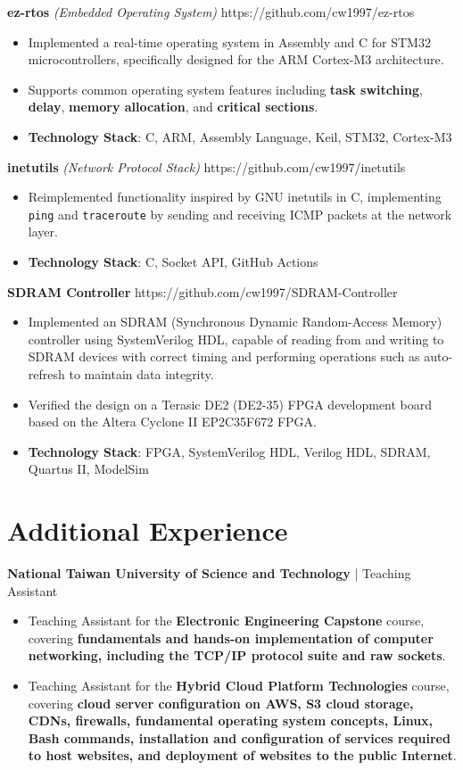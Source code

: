 \documentclass{resume}
\newcommand{\iconsection}[2]{
  \section[\texorpdfstring{#2}{#2}]{\faIcon{#1}\quad #2}
}
\begin{document}
  \datedsubsection
  {\textbf{ez-rtos}\textit{ (Embedded Operating System)}}
  {https://github.com/cw1997/ez-rtos}
  \begin{itemize}
    \item Implemented a real-time operating system in Assembly and C for STM32 microcontrollers, specifically designed for the ARM Cortex-M3 architecture.
    \item Supports common operating system features including \textbf{task switching}, \textbf{delay}, \textbf{memory allocation}, and \textbf{critical sections}.
    \item \textbf{Technology Stack}: C, ARM, Assembly Language, Keil, STM32, Cortex-M3
  \end{itemize}

  \datedsubsection
  {\textbf{inetutils}\textit{ (Network Protocol Stack)}}
  {https://github.com/cw1997/inetutils}
  \begin{itemize}
    \item Reimplemented functionality inspired by GNU inetutils in C, implementing \texttt{ping} and \texttt{traceroute} by sending and receiving ICMP packets at the network layer.
    \item \textbf{Technology Stack}: C, Socket API, GitHub Actions
  \end{itemize}

  \datedsubsection
  {\textbf{SDRAM Controller}}
  {https://github.com/cw1997/SDRAM-Controller}
  \begin{itemize}
    \item Implemented an SDRAM (Synchronous Dynamic Random-Access Memory) controller using SystemVerilog HDL, capable of reading from and writing to SDRAM devices with correct timing and performing operations such as auto-refresh to maintain data integrity.
    \item Verified the design on a Terasic DE2 (DE2-35) FPGA development board based on the Altera Cyclone II EP2C35F672 FPGA.
    \item \textbf{Technology Stack}: FPGA, SystemVerilog HDL, Verilog HDL, SDRAM, Quartus II, ModelSim
  \end{itemize}

  \iconsection{history}{Additional Experience}

  \datedsubsection
  {\textbf{National Taiwan University of Science and Technology} | Teaching Assistant}
  {}
  \begin{itemize}
    \item Teaching Assistant for the \textbf{Electronic Engineering Capstone} course, covering \textbf{fundamentals and hands-on implementation of computer networking, including the TCP/IP protocol suite and raw sockets}.
    \item Teaching Assistant for the \textbf{Hybrid Cloud Platform Technologies} course, covering \textbf{cloud server configuration on AWS, S3 cloud storage, CDNs, firewalls, fundamental operating system concepts, Linux, Bash commands, installation and configuration of services required to host websites, and deployment of websites to the public Internet}.
  \end{itemize}
\end{document}
